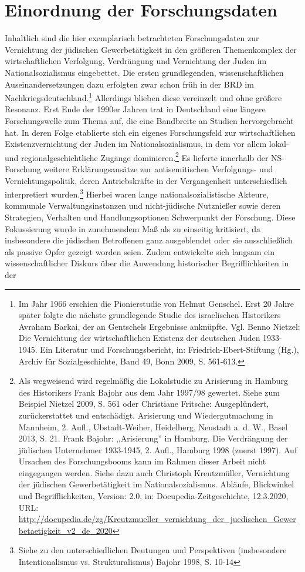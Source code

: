 \onehalfspacing

\section{Einordnung der Forschungsdaten} 

Inhaltlich sind die hier exemplarisch betrachteten Forschungsdaten zur Vernichtung der jüdischen Gewerbetätigkeit in den größeren Themenkomplex der wirtschaftlichen Verfolgung, Verdrängung und Vernichtung der Juden im Nationalsozialismus eingebettet. Die ersten grundlegenden, wissenschaftlichen Auseinandersetzungen dazu erfolgten zwar schon früh in der BRD im Nachkriegsdeutschland.\footnote{Im Jahr 1966 erschien die Pionierstudie von Helmut Genschel. Erst 20 Jahre später folgte die nächste grundlegende Studie des israelischen Historikers Avraham Barkai, der an Gentschels Ergebnisse anknüpfte. Vgl. Benno Nietzel: Die Vernichtung der wirtschaftlichen Existenz der deutschen Juden 1933-1945. Ein Literatur und Forschungsbericht, in: Friedrich-Ebert-Stiftung (Hg.), Archiv für Sozialgeschichte, Band 49, Bonn 2009, S. 561-613.} Allerdings blieben diese vereinzelt und ohne größere Resonanz. Erst Ende der 1990er Jahren trat in Deutschland eine längere Forschungswelle zum Thema auf, die eine Bandbreite an Studien hervorgebracht hat. In deren Folge etablierte sich ein eigenes Forschungsfeld zur wirtschaftlichen Existenzvernichtung der Juden im Nationalsozialismus, in dem vor allem lokal- und regionalgeschichtliche Zugänge dominieren.\footnote{Als wegweisend wird regelmäßig die Lokalstudie zu Arisierung in Hamburg des Historikers Frank Bajohr aus dem Jahr 1997/98 gewertet. Siehe zum Beispiel Nietzel 2009, S. 561 oder Christiane Fritsche: Ausgeplündert, zurückerstattet und entschädigt. Arisierung und Wiedergutmachung in Mannheim, 2. Aufl., Ubstadt-Weiher, Heidelberg, Neustadt a. d. W., Basel 2013, S. 21. Frank Bajohr: ,,Arisierung'' in Hamburg. Die Verdrängung der jüdischen Unternehmer 1933-1945, 2. Aufl., Hamburg 1998 (zuerst 1997). Auf Ursachen des Forschungsbooms kann im Rahmen dieser Arbeit nicht eingegangen werden. Siehe dazu auch Christoph Kreutzmüller, Vernichtung der jüdischen Gewerbetätigkeit im Nationalsozialismus. Abläufe, Blickwinkel und Begrifflichkeiten, Version: 2.0, in: Docupedia-Zeitgeschichte, 12.3.2020, URL: \url{http://docupedia.de/zg/Kreutzmueller_vernichtung_der_juedischen_Gewerbetaetigkeit_v2_de_2020}} Es lieferte innerhalb der NS-Forschung weitere Erklärungsansätze zur antisemitischen Verfolgungs- und Vernichtungspolitik, deren Antriebskräfte in der Vergangenheit unterschiedlich interpretiert wurden.\footnote{Siehe zu den unterschiedlichen Deutungen und Perspektiven (insbesondere Intentionalismus vs. Strukturalismus) Bajohr 1998, S. 10-14} Hierbei waren lange nationalsozialistische Akteure, kommunale Verwaltungsinstanzen und nicht-jüdische Nutznießer sowie deren Strategien, Verhalten und Handlungsoptionen Schwerpunkt der Forschung. Diese Fokussierung wurde in zunehmendem Maß als zu einseitig kritisiert, da insbesondere die jüdischen Betroffenen ganz ausgeblendet oder sie ausschließlich als passive Opfer gezeigt worden seien. Zudem entwickelte sich langsam ein wissenschaftlicher Diskurs über die Anwendung historischer Begrifflichkeiten in der 